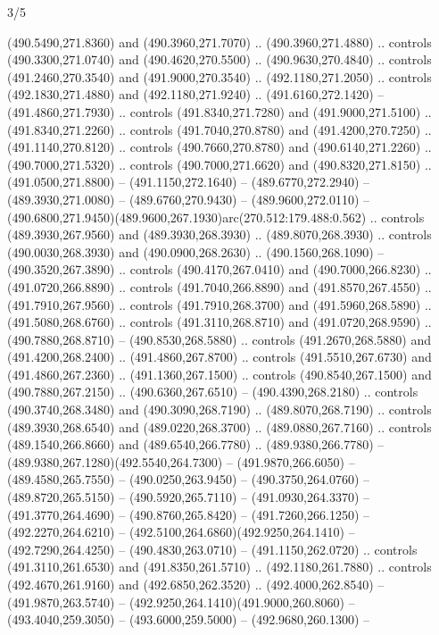 \begin{flagdescription}{3/5}
\begin{scope}[shift={(0.5\flaglength,0.5\flagwidth)},scale=\flagwidth/1075]
\begin{scope}[y=0.80pt, x=0.80pt, yscale=-2.37, xscale=2.37,xshift=-402,yshift=-230.4]
  (490.5490,271.8360) and (490.3960,271.7070) .. (490.3960,271.4880) .. controls
  (490.3300,271.0740) and (490.4620,270.5500) .. (490.9630,270.4840) .. controls
  (491.2460,270.3540) and (491.9000,270.3540) .. (492.1180,271.2050) .. controls
  (492.1830,271.4880) and (492.1180,271.9240) .. (491.6160,272.1420) --
  (491.4860,271.7930) .. controls (491.8340,271.7280) and (491.9000,271.5100) ..
  (491.8340,271.2260) .. controls (491.7040,270.8780) and (491.4200,270.7250) ..
  (491.1140,270.8120) .. controls (490.7660,270.8780) and (490.6140,271.2260) ..
  (490.7000,271.5320) .. controls (490.7000,271.6620) and (490.8320,271.8150) ..
  (491.0500,271.8800) -- (491.1150,272.1640) -- (489.6770,272.2940) --
  (489.3930,271.0080) -- (489.6760,270.9430) -- (489.9600,272.0110) --
  (490.6800,271.9450)(489.9600,267.1930)arc(270.512:179.488:0.562) .. controls
  (489.3930,267.9560) and (489.3930,268.3930) .. (489.8070,268.3930) .. controls
  (490.0030,268.3930) and (490.0900,268.2630) .. (490.1560,268.1090) --
  (490.3520,267.3890) .. controls (490.4170,267.0410) and (490.7000,266.8230) ..
  (491.0720,266.8890) .. controls (491.7040,266.8890) and (491.8570,267.4550) ..
  (491.7910,267.9560) .. controls (491.7910,268.3700) and (491.5960,268.5890) ..
  (491.5080,268.6760) .. controls (491.3110,268.8710) and (491.0720,268.9590) ..
  (490.7880,268.8710) -- (490.8530,268.5880) .. controls (491.2670,268.5880) and
  (491.4200,268.2400) .. (491.4860,267.8700) .. controls (491.5510,267.6730) and
  (491.4860,267.2360) .. (491.1360,267.1500) .. controls (490.8540,267.1500) and
  (490.7880,267.2150) .. (490.6360,267.6510) -- (490.4390,268.2180) .. controls
  (490.3740,268.3480) and (490.3090,268.7190) .. (489.8070,268.7190) .. controls
  (489.3930,268.6540) and (489.0220,268.3700) .. (489.0880,267.7160) .. controls
  (489.1540,266.8660) and (489.6540,266.7780) .. (489.9380,266.7780) --
  (489.9380,267.1280)(492.5540,264.7300) -- (491.9870,266.6050) --
  (489.4580,265.7550) -- (490.0250,263.9450) -- (490.3750,264.0760) --
  (489.8720,265.5150) -- (490.5920,265.7110) -- (491.0930,264.3370) --
  (491.3770,264.4690) -- (490.8760,265.8420) -- (491.7260,266.1250) --
  (492.2270,264.6210) -- (492.5100,264.6860)(492.9250,264.1410) --
  (492.7290,264.4250) -- (490.4830,263.0710) -- (491.1150,262.0720) .. controls
  (491.3110,261.6530) and (491.8350,261.5710) .. (492.1180,261.7880) .. controls
  (492.4670,261.9160) and (492.6850,262.3520) .. (492.4000,262.8540) --
  (491.9870,263.5740) -- (492.9250,264.1410)(491.9000,260.8060) --
  (493.4040,259.3050) -- (493.6000,259.5000) -- (492.9680,260.1300) --

\end{scope}
\end{scope}
\end{flagdescription}

